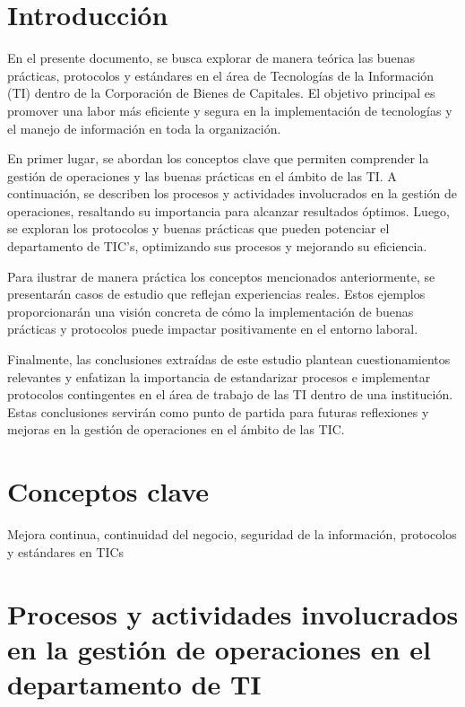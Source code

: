 \documentclass{article}
\begin{document}
\tableofcontents

\section{Introducción}
En el presente documento, se busca explorar de manera teórica las buenas prácticas, protocolos y estándares en el área de Tecnologías de la Información (TI) dentro de la Corporación de Bienes de Capitales. El objetivo principal es promover una labor más eficiente y segura en la implementación de tecnologías y el manejo de información en toda la organización.

En primer lugar, se abordan los conceptos clave que permiten comprender la gestión de operaciones y las buenas prácticas en el ámbito de las TI. A continuación, se describen los procesos y actividades involucrados en la gestión de operaciones, resaltando su importancia para alcanzar resultados óptimos. Luego, se exploran los protocolos y buenas prácticas que pueden potenciar el departamento de TIC's, optimizando sus procesos y mejorando su eficiencia.

Para ilustrar de manera práctica los conceptos mencionados anteriormente, se presentarán casos de estudio que reflejan experiencias reales. Estos ejemplos proporcionarán una visión concreta de cómo la implementación de buenas prácticas y protocolos puede impactar positivamente en el entorno laboral.

Finalmente, las conclusiones extraídas de este estudio plantean cuestionamientos relevantes y enfatizan la importancia de estandarizar procesos e implementar protocolos contingentes en el área de trabajo de las TI dentro de una institución. Estas conclusiones servirán como punto de partida para futuras reflexiones y mejoras en la gestión de operaciones en el ámbito de las TIC.

\section{Conceptos clave}
Mejora continua, continuidad del negocio, seguridad de la información, protocolos y estándares en TICs

\section{Procesos y actividades involucrados en la gestión de operaciones en el departamento de TI}
\end{document}

